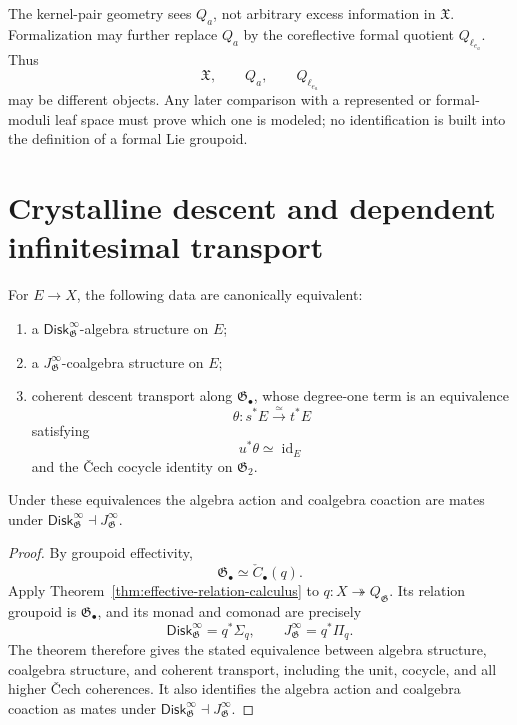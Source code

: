 \begin{remark}
The kernel-pair geometry sees $Q_a$, not arbitrary excess information in
$\mathfrak X$.  Formalization may further replace $Q_a$ by the coreflective
formal quotient $Q_{\ell_{e_a}}$.  Thus
\[
    \mathfrak X,
    \qquad
    Q_a,
    \qquad
    Q_{\ell_{e_a}}
\]
may be different objects.  Any later comparison with a represented or
formal-moduli leaf space must prove which one is modeled; no identification is
built into the definition of a formal Lie groupoid.
\end{remark}

\section{Crystalline descent and dependent infinitesimal transport}
\label{sec:flg-descent}

\begin{theorem}
\label{thm:formal-groupoid-transport-mates}
For $E\to X$, the following data are canonically equivalent:
\begin{enumerate}
    \item a $\mathsf{Disk}^{\infty}_{\mathfrak G}$-algebra structure on $E$;
    \item a $J^\infty_{\mathfrak G}$-coalgebra structure on $E$;
    \item coherent descent transport along $\mathfrak G_\bullet$, whose
    degree-one term is an equivalence
    \[
        \theta:s^*E\xrightarrow{\simeq}t^*E
    \]
    satisfying
    \[
        u^*\theta\simeq\operatorname{id}_E
    \]
    and the \v{C}ech cocycle identity on $\mathfrak G_2$.
\end{enumerate}
Under these equivalences the algebra action and coalgebra coaction are mates
under
$\mathsf{Disk}^{\infty}_{\mathfrak G}\dashv J^\infty_{\mathfrak G}$.
\end{theorem}

\begin{proof}
By groupoid effectivity,
\[
    \mathfrak G_\bullet
    \simeq
    \check C_\bullet(q).
\]
Apply Theorem~\ref{thm:effective-relation-calculus} to
$q:X\twoheadrightarrow Q_{\mathfrak G}$.  Its relation groupoid is
$\mathfrak G_\bullet$, and its monad and comonad are precisely
\[
    \mathsf{Disk}^{\infty}_{\mathfrak G}=q^*\Sigma_q,
    \qquad
    J^\infty_{\mathfrak G}=q^*\Pi_q.
\]
The theorem therefore gives the stated equivalence between algebra structure,
coalgebra structure, and coherent transport, including the unit, cocycle, and
all higher \v{C}ech coherences.  It also identifies the algebra action and
coalgebra coaction as mates under
$\mathsf{Disk}^{\infty}_{\mathfrak G}\dashv J^\infty_{\mathfrak G}$.
\end{proof}

